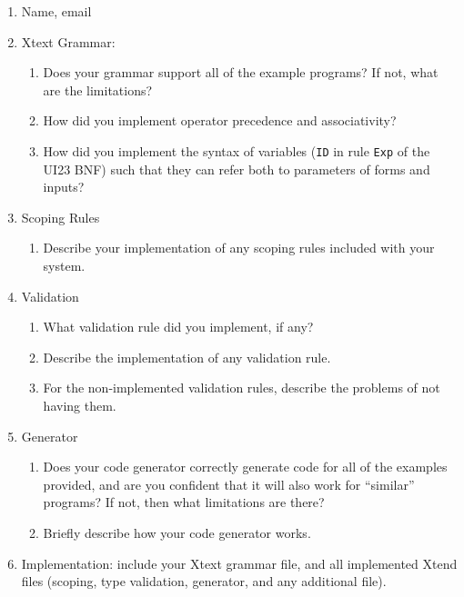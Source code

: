 \documentclass[12pt]{article}
\begin{document}
\begin{enumerate}
\item Name, email
\item Xtext Grammar:
  \begin{enumerate}
  \item Does your grammar support all of the example programs? If not, what are the limitations?
  \item How did you implement operator precedence and associativity?
  \item How did you implement the syntax of variables ({\tt ID} in rule {\tt Exp} of the UI23 BNF) such that they can refer both to parameters of forms and inputs?
  \end{enumerate}
\item Scoping Rules
  \begin{enumerate}
    \item Describe your implementation of any scoping rules included with your system.
  \end{enumerate}
\item Validation
  \begin{enumerate}
  \item What validation rule did you implement, if any?
  \item Describe the implementation of any validation rule.
  \item For the non-implemented validation rules, describe the problems of not having them.
  \end{enumerate}
\item Generator
  \begin{enumerate}
  \item Does your code generator correctly generate code for all of the examples provided, and are you confident that it will also work for ``similar'' programs? If not, then what limitations are there?
  \item Briefly describe how your code generator works.
  \end{enumerate}
\item Implementation: include your Xtext grammar file, and all implemented Xtend files (scoping, type validation, generator, and any additional file).
\end{enumerate}
\end{document}
